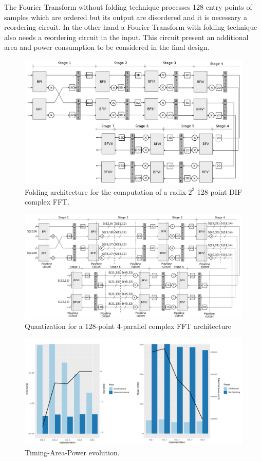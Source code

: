 \documentclass[journal,comsoc]{IEEEtran}
\begin{document}
 The Fourier Transform without folding technique processes 128 entry points of samples which are ordered but its output are disordered and it is necessary a reordering circuit. 
In the other hand a Fourier Transform with folding technique also needs a reordering circuit in the input. This circuit present an additional area and power consumption to be considered in the final design. 




\begin{figure} 
	\centering
	\includegraphics[width=0.6\linewidth]{Diagramas/folding-128.png}
	\caption{Folding architecture for the computation of a radix-$2^3$ 128-point DIF complex FFT.}
	\label{fig:folding_128}
\end{figure}


\begin{figure} 
	\centering
	\includegraphics[width=0.8\linewidth]{Diagramas/folding-128-quant-pipe.png}
	\caption{Quantization for a 128-point 4-parallel complex FFT architecture}
	\label{fig:4paralelo128pradix8cuantizacion1}
\end{figure}



\begin{figure}[ht!]
	\centering
	\includegraphics[width=0.85\linewidth]{Diagramas/areaTiempoPower.pdf}
	\caption{Timing-Area-Power evolution.}
	\label{fig:atp}
\end{figure}





\end{document}
